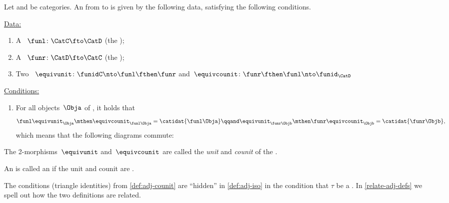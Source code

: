 \begin{ctdefinition}
    \label{def:adj-counit}
    \label{def:cat-adjunction-v2}
    Let \CatC and \CatD be categories.
    An  from \CatC to \CatD is given by the following data, satisfying the following conditions.

    \underline{Data:}
    \begin{enumerate}
        \item A ~$\funl \colon \CatC \fto \CatD$ (the );
        \item A ~$\funr \colon \CatD \fto \CatC$ (the );
        \item Two ~$\equivunit \colon \funidC \nto \funl  \fthen \funr $ and~$\equivcounit\colon \funr \fthen \funl \nto \funid_\CatD$
    \end{enumerate}

    \underline{Conditions:}
    \begin{enumerate}
        \item For all objects~$\Obja$ of \CatC, it holds that
              \begin{equation}
                  \funl \equivunit_\Obja \mthen \equivcounit_{\funl\Obja} = \catidat{\funl\Obja} \qqand
                  \equivunit_{\funr\Objb} \mthen \funr\equivcounit_\Objb = \catidat{\funr\Objb},
              \end{equation}
              which means that the following diagrams commute:
    \end{enumerate}

    The 2-morphisms~$\equivunit$ and~$\equivcounit$ are called the \emph{unit} and \emph{counit} of the .

\end{ctdefinition}
\begin{ctdefinition}
    \label{def:adjoin-equivalence}
    An  is called an  if the unit and counit are .
\end{ctdefinition}

\begin{remark}
    The conditions (triangle identities) from \cref{def:adj-counit} are ``hidden'' in \cref{def:adj-iso} in the condition that $\tau$ be a .
    In \cref{relate-adj-defs} we spell out how the two definitions are related.
\end{remark}

